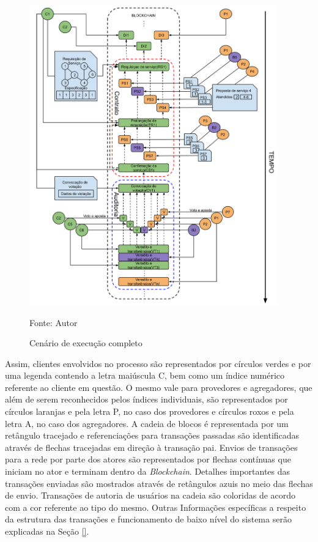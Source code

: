 \begin{figure}[h!]
\caption{Cenário de execução completo}
\centering
\includegraphics[width=0.96\textwidth]{imagens/cenario_execucao.png}
\begin{center}
        Fonte: Autor
\end{center}
\label{fig:cenario_execucao}
\end{figure}


Assim, clientes envolvidos no processo são representados por círculos verdes e por uma legenda contendo a letra maiúscula C, bem como um índice numérico referente ao cliente em questão. O mesmo vale para provedores e agregadores, que além de serem reconhecidos pelos índices individuais, são representados por círculos laranjas e pela letra P, no caso dos provedores e círculos roxos e pela letra A, no caso dos agregadores. A cadeia de blocos é representada por um retângulo tracejado e referenciações para transações passadas são identificadas através de flechas tracejadas em direção à transação pai. Envios de transações para a rede por parte dos atores são representados por flechas contínuas que iniciam no ator e terminam dentro da \textit{Blockchain}. Detalhes importantes das transações enviadas são mostrados através de retângulos azuis no meio das flechas de envio. Transações de autoria de usuários na cadeia são coloridas de acordo com a cor referente ao tipo do mesmo. Outras Informações específicas a respeito da estrutura das transações e funcionamento de baixo nível do sistema serão explicadas na Seção \ref{}.

